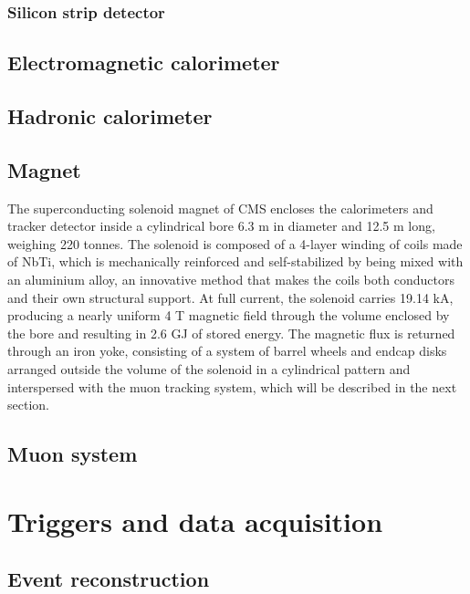 \subsubsection{Silicon strip detector\label{sec:cms-strips}}

\subsection{Electromagnetic calorimeter\label{sec:cms-ecal}}

\subsection{Hadronic calorimeter\label{sec:cms-hcal}}

\subsection{Magnet\label{sec:cms-magnet}}

The superconducting solenoid magnet of CMS encloses the calorimeters and tracker detector inside a cylindrical bore 6.3 m in diameter and 12.5 m long, weighing 220 tonnes. The solenoid is composed of a 4-layer winding of coils made of NbTi, which is mechanically reinforced and self-stabilized by being mixed with an aluminium alloy, an innovative method that makes the coils both conductors and their own structural support. At full current, the solenoid carries 19.14 kA, producing a nearly uniform 4 T magnetic field through the volume enclosed by the bore and resulting in 2.6 GJ of stored energy. The magnetic flux is returned through an iron yoke, consisting of a system of barrel wheels and endcap disks arranged outside the volume of the solenoid in a cylindrical pattern and interspersed with the muon tracking system, which will be described in the next section.

\subsection{Muon system\label{sec:cms-muon}}

\section{Triggers and data acquisition\label{sec:cms-triggerdaq}}

\subsection{Event reconstruction\label{sec:cms-reco}}
